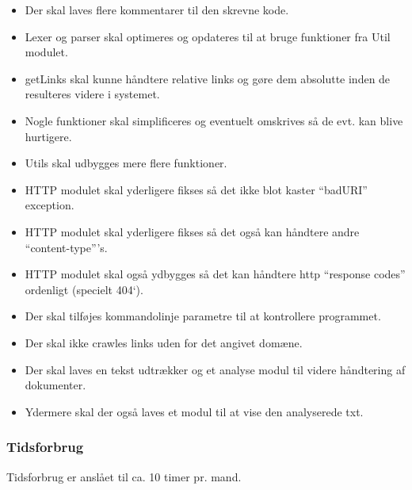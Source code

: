\begin{itemize}
 \item Der skal laves flere kommentarer til den skrevne kode.
\item Lexer og parser skal optimeres og opdateres til at bruge funktioner fra Util modulet.
\item getLinks skal kunne håndtere relative links og gøre dem absolutte inden de resulteres videre i systemet.
\item Nogle funktioner skal simplificeres og eventuelt omskrives så de evt. kan blive hurtigere.
\item Utils skal udbygges mere flere funktioner.
\item HTTP modulet skal yderligere fikses så det ikke blot kaster ``badURI'' exception.
\item HTTP modulet skal yderligere fikses så det også kan håndtere andre ``content-type'''s.
\item HTTP modulet skal også ydbygges så det kan håndtere http ``response codes'' ordenligt (specielt 404`).
\item Der skal tilføjes kommandolinje parametre til at kontrollere programmet.
\item Der skal ikke crawles links uden for det angivet domæne.
\item Der skal laves en tekst udtrækker og et analyse modul til videre håndtering af dokumenter.
\item Ydermere skal der også laves et modul til at vise den analyserede txt.
\end{itemize}


\subsubsection{Tidsforbrug}
Tidsforbrug er anslået til ca. 10 timer pr. mand.
